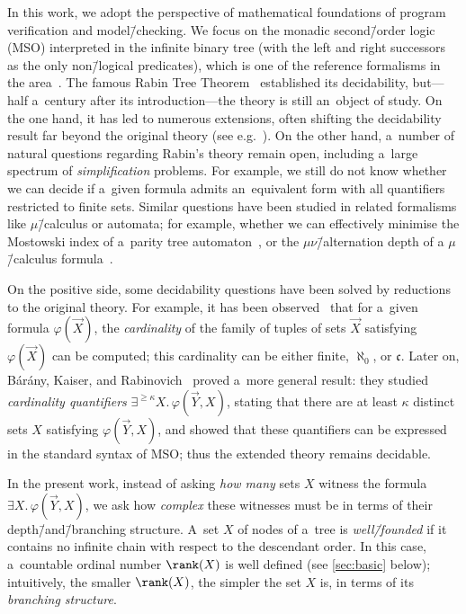 In this work, we adopt the perspective of mathematical foundations of program verification and model\=/checking.
We focus on the monadic second\=/order logic (MSO) interpreted in the
infinite binary tree (with the left and right successors as the only
non\=/logical predicates), which is one of the reference formalisms in the area~\cite{thomas_languages}.
The famous Rabin Tree Theorem~\cite{rabin_s2s} established its decidability, but---half a~century after its introduction---the theory is still an~object of study.
On the one hand, it has led to numerous extensions, often shifting the decidability result far beyond the original theory (see e.g.~\cite{bojanczyk_wmso_u_p,ong_model_checking_higher_order}).
On the other hand, a~number of natural questions regarding Rabin's theory remain open, including a~large spectrum of \emph{simplification} problems.
For example, we still do not know whether we can decide if a~given formula admits an~equivalent form with all quantifiers restricted to finite sets.
Similar questions have been studied in related formalisms like $\mu$\=/calculus or automata;
for example, whether we can effectively minimise the Mostowski index of a~parity tree automaton~\cite{loding_index_to_bounds,murlak_game_auto},
or the $\mu \nu $\=/alternation depth of a $\mu$\=/calculus formula~\cite{bradfield_simplifying}.

On the positive side, some decidability questions have been solved by reductions to the original theory.
For example, it has been observed~\cite{niwinski_cardinality} that for a~given formula $\varphi(\vec{X})$,
the \emph{cardinality} of the family of tuples of sets $\vec{X}$ satisfying $\varphi(\vec{X})$ can be computed;
this cardinality can be either finite, $\aleph_0$, or $\mathfrak c$.
Later on, B\'ar\'any, Kaiser, and Rabinovich~\cite{barany_expressing_trees} proved a~more general result: they studied \emph{cardinality quantifiers} $\exists^{\geq \kappa} X.\, \varphi(\vec{Y}, X)$,
stating that there are at least $\kappa$ distinct sets $X$ satisfying $\varphi(\vec{Y}, X)$, and showed that these quantifiers can be expressed in the standard syntax of MSO;
thus the extended theory remains decidable.

In the present work, instead of asking \emph{how many} sets $X$ witness the formula $\exists X.\, \varphi(\vec{Y},X)$,
we ask how \emph{complex} these witnesses must be in terms of their depth\=/and\=/branching structure.
A~set $X$ of nodes of a~tree is \emph{well\=/founded} if it contains no infinite chain with respect to the descendant order.
In this case, a~countable ordinal number $\rank(X)$ is well defined (see \cref{sec:basic} below);
intuitively, the smaller $\rank(X)$, the simpler the set $X$ is, in terms of its \emph{branching structure}.

